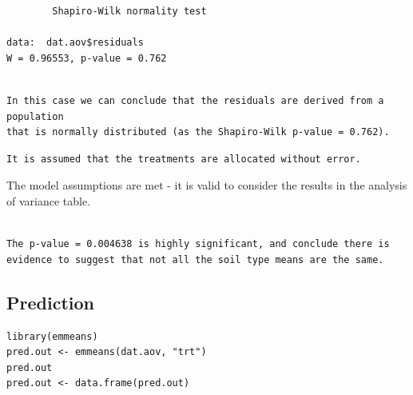 \documentclass[a4paper, 10pt, fleqn, twosided]{memoir}
\begin{document}
\begin{tcolorbox}[title = Example 4 Shapiro-Wilk normality test output]
\begin{verbatim}
        Shapiro-Wilk normality test

data:  dat.aov$residuals
W = 0.96553, p-value = 0.762
\end{verbatim}
\end{tcolorbox}


\begin{tcolorbox}[title = Example 4 Shapiro-Wilk normality test interpretation]
\begin{verbatim}

In this case we can conclude that the residuals are derived from a population
that is normally distributed (as the Shapiro-Wilk p-value = 0.762).

\end{verbatim}
\end{tcolorbox}



\begin{tcolorbox}[title = Example 4 Assumption 5]
\begin{verbatim}
It is assumed that the treatments are allocated without error.
\end{verbatim}
\end{tcolorbox}

The model assumptions are met - it is valid to consider the results in the analysis of variance table.

\begin{tcolorbox}[title = Example 4 ANOVA interpretation]
\begin{verbatim}

The p-value = 0.004638 is highly significant, and conclude there is
evidence to suggest that not all the soil type means are the same.
\end{verbatim}
\end{tcolorbox}
\subsection{Prediction}

\begin{tcolorbox}[title = Example 4 predicted values]
\begin{verbatim}
library(emmeans)
pred.out <- emmeans(dat.aov, "trt")
pred.out
pred.out <- data.frame(pred.out)
\end{verbatim}
\end{tcolorbox}
\end{document}

